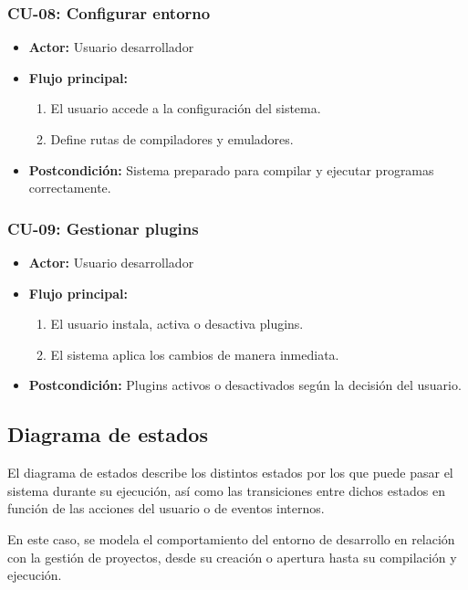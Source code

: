 \documentclass[../../main.tex]{subfiles}
\begin{document}
\subsubsection*{CU-08: Configurar entorno}
\begin{itemize}
    \item \textbf{Actor:} Usuario desarrollador
    \item \textbf{Flujo principal:}
        \begin{enumerate}
            \item El usuario accede a la configuración del sistema.
            \item Define rutas de compiladores y emuladores.
        \end{enumerate}
    \item \textbf{Postcondición:} Sistema preparado para compilar y ejecutar programas correctamente.
\end{itemize}

\subsubsection*{CU-09: Gestionar plugins}
\begin{itemize}
    \item \textbf{Actor:} Usuario desarrollador
    \item \textbf{Flujo principal:}
        \begin{enumerate}
            \item El usuario instala, activa o desactiva plugins.
            \item El sistema aplica los cambios de manera inmediata.
        \end{enumerate}
    \item \textbf{Postcondición:} Plugins activos o desactivados según la decisión del usuario.
\end{itemize}

\clearpage

\subsection{Diagrama de estados}

El diagrama de estados describe los distintos estados por los que puede pasar el sistema durante su ejecución, así como las transiciones entre dichos estados en función de las acciones del usuario o de eventos internos.

En este caso, se modela el comportamiento del entorno de desarrollo en relación con la gestión de proyectos, desde su creación o apertura hasta su compilación y ejecución.
\end{document}

